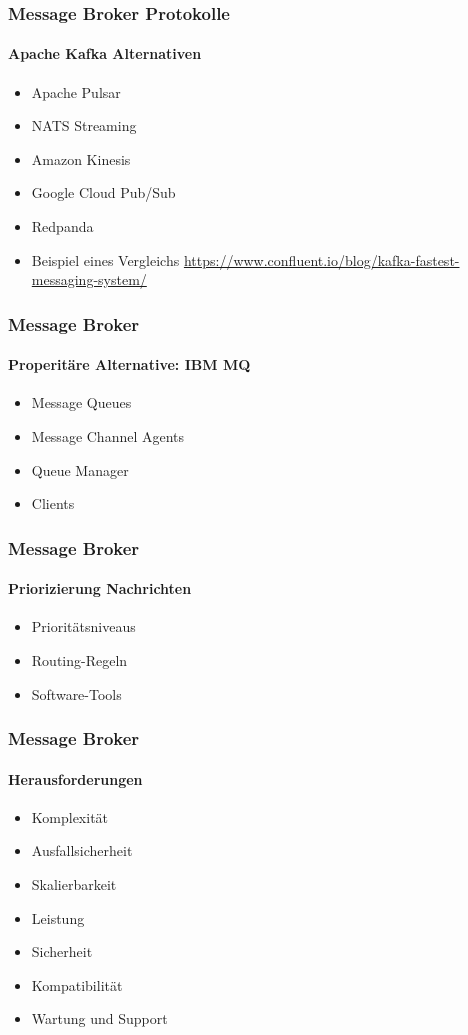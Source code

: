 \begin{frame}
  \frametitle{Message Broker Protokolle}
  \framesubtitle{Apache Kafka Alternativen}
  \begin{itemize}
    \item Apache Pulsar
    \item NATS Streaming 
    \item Amazon Kinesis
    \item Google Cloud Pub/Sub
    \item Redpanda
    \item Beispiel eines Vergleichs \url{https://www.confluent.io/blog/kafka-fastest-messaging-system/}
  \end{itemize}
\end{frame}

\begin{frame}
  \frametitle{Message Broker}
  \framesubtitle{Properitäre Alternative: IBM MQ}
  \begin{itemize}
    \item Message Queues
    \item Message Channel Agents
    \item Queue Manager
    \item Clients
  \end{itemize}
\end{frame}

\begin{frame}
  \frametitle{Message Broker}
  \framesubtitle{Priorizierung Nachrichten}
  \begin{itemize}
    \item Prioritätsniveaus
    \item Routing-Regeln
    \item Software-Tools
  \end{itemize}
\end{frame}

\begin{frame}
  \frametitle{Message Broker}
  \framesubtitle{Herausforderungen}
  \begin{itemize}
    \item Komplexität
    \item Ausfallsicherheit
    \item Skalierbarkeit
    \item Leistung
    \item Sicherheit
    \item Kompatibilität
    \item Wartung und Support
  \end{itemize}
\end{frame}

